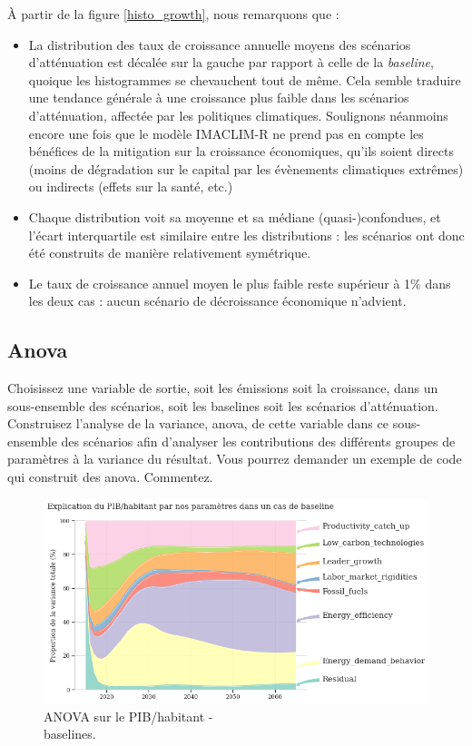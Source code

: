 \documentclass[a4,11pt]{aleph-notas}
\newcommand{\ans}[1]{
\begin{mdframed}[
    roundcorner=10pt,     %
    backgroundcolor=gray!20, %
    linecolor=black,      %
    linewidth=1pt,        %
    innertopmargin=10pt,  %
    innerbottommargin=10pt, %
    innerleftmargin=10pt,  %
    innerrightmargin=10pt  %
]
#1
\end{mdframed}
}
\begin{document}
À partir de la figure \ref{histo_growth}, nous remarquons que : 
\begin{itemize}
    \item La distribution des taux de croissance annuelle moyens des scénarios d'atténuation est décalée sur la gauche par rapport à celle de la \textit{baseline}, quoique les histogrammes se chevauchent tout de même. Cela semble traduire une tendance générale à une croissance plus faible dans les scénarios d'atténuation, affectée par les politiques climatiques. Soulignons néanmoins encore une fois que le modèle IMACLIM-R ne prend pas en compte les bénéfices de la mitigation sur la croissance économiques, qu'ils soient directs (moins de dégradation sur le capital par les évènements climatiques extrêmes) ou indirects (effets sur la santé, etc.)
    \item Chaque distribution voit sa moyenne et sa médiane (quasi-)confondues, et l'écart interquartile est similaire entre les distributions : les scénarios ont donc été construits de manière relativement symétrique.
    \item Le taux de croissance annuel moyen le plus faible reste supérieur à 1\% dans les deux cas : aucun scénario de décroissance économique n'advient.
\end{itemize}


\subsection{Anova}
\ans{Choisissez une variable de sortie, soit les émissions soit la croissance, dans un sous-ensemble des scénarios, soit les baselines soit les scénarios d’atténuation. Construisez l’analyse de la variance, anova, de cette variable dans ce sous-ensemble des scénarios afin d’analyser les contributions des différents groupes de paramètres à la variance du résultat. Vous pourrez demander un exemple de code qui construit des anova. Commentez.}

\begin{figure}[H]
        \centering
        \includegraphics[width=\textwidth]{images_IMACLIM/anova_baseline.png}
        \caption{ANOVA sur le PIB/habitant - \\
        baselines.}
        \label{fig:anova_baseline}
\end{figure}
\end{document}
